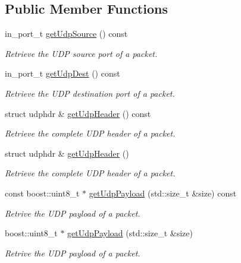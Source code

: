 \subsection*{\-Public \-Member \-Functions}
\begin{DoxyCompactItemize}
\item 
in\-\_\-port\-\_\-t \hyperlink{classIPQ_1_1IpqUdpPacket_a4418916762f64f6996bd5cb1d7102c6e}{get\-Udp\-Source} () const 
\begin{DoxyCompactList}\small\item\em \-Retrieve the \-U\-D\-P source port of a packet. \end{DoxyCompactList}\item 
in\-\_\-port\-\_\-t \hyperlink{classIPQ_1_1IpqUdpPacket_aaf059aaa0d6027dd23e701c691ad07a7}{get\-Udp\-Dest} () const 
\begin{DoxyCompactList}\small\item\em \-Retrieve the \-U\-D\-P destination port of a packet. \end{DoxyCompactList}\item 
struct udphdr \& \hyperlink{classIPQ_1_1IpqUdpPacket_a88d136acc4488ec965f1d9d3acdc1c33}{get\-Udp\-Header} () const 
\begin{DoxyCompactList}\small\item\em \-Retrieve the complete \-U\-D\-P header of a packet. \end{DoxyCompactList}\item 
struct udphdr \& \hyperlink{classIPQ_1_1IpqUdpPacket_aeb63764de6bdb3a17f9c002414c4952b}{get\-Udp\-Header} ()
\begin{DoxyCompactList}\small\item\em \-Retrieve the complete \-U\-D\-P header of a packet. \end{DoxyCompactList}\item 
const boost\-::uint8\-\_\-t $\ast$ \hyperlink{classIPQ_1_1IpqUdpPacket_acfa3b21105ee5bc463d623e360bf492f}{get\-Udp\-Payload} (std\-::size\-\_\-t \&size) const 
\begin{DoxyCompactList}\small\item\em \-Retrive the \-U\-D\-P payload of a packet. \end{DoxyCompactList}\item 
boost\-::uint8\-\_\-t $\ast$ \hyperlink{classIPQ_1_1IpqUdpPacket_ac8751d02bda5f3f6e56fe990658cb4c7}{get\-Udp\-Payload} (std\-::size\-\_\-t \&size)
\begin{DoxyCompactList}\small\item\em \-Retrive the \-U\-D\-P payload of a packet. \end{DoxyCompactList}\item 

\end{DoxyCompactItemize}
